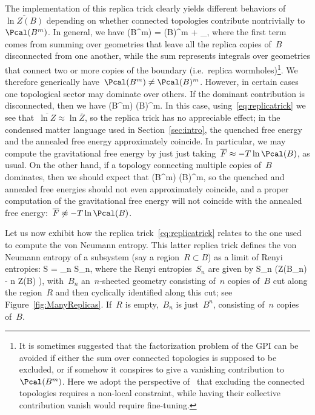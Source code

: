\documentclass[12pt]{article}
\begin{document}
The implementation of this replica trick clearly yields different behaviors of~$\overline{\ln Z(B)}$ depending on whether connected topologies contribute nontrivially to~$\Pcal(B^m)$.  In general, we have
\be
\Pcal(B^m) = \Pcal(B)^m + \sum_{},
\ee
where the first term comes from summing over geometries that leave all the replica copies of~$B$ disconnected from one another, while the sum represents integrals over geometries that connect two or more copies of the boundary (i.e.~replica wormholes)\footnote{It is sometimes suggested that the factorization problem of the GPI can be avoided if either the sum over connected topologies is supposed to be excluded, or if somehow it conspires to give a vanishing contribution to~$\Pcal(B^m)$.  Here we adopt the perspective of~\cite{MarMax20} that excluding the connected topologies requires a non-local constraint, while having their collective contribution vanish would require fine-tuning.}.  We therefore generically have~$\Pcal(B^m) \neq \Pcal(B)^m$.  However, in certain cases one topological sector may dominate over others.  If the dominant contribution is disconnected, then 
we have
\be
\Pcal(B^m) \approx \Pcal(B)^m.
\ee
In this case, using~\eqref{eq:replicatrick} we see that~$\overline{\ln Z} \approx \ln \overline{Z}$, so the replica trick has no appreciable effect; in the condensed matter language used in Section~\ref{sec:intro}, the quenched free energy and the annealed free energy approximately coincide.  In particular, we may compute the gravitational free energy by just just taking~$\overline{F} \approx -T \ln \Pcal(B)$, as usual.  On the other hand, if a topology connecting multiple copies of~$B$ dominates, then we should expect that
\be
\Pcal(B^m) \not\approx \Pcal(B)^m,
\ee
so the quenched and annealed free energies should not even approximately coincide, and a proper computation of the gravitational free energy will not coincide with the annealed free energy:~$\overline{F} \not\approx -T \ln \Pcal(B)$.

Let us now exhibit how the replica trick~\eqref{eq:replicatrick} relates to the one used to compute the von Neumann entropy.  This latter replica trick defines the von Neumann entropy of a subsystem (say a region~$R \subset B$) as a limit of Renyi entropies:
\be
S = \lim_{n } S_n,
\ee
where the Renyi entropies~$S_n$ are given by
\be
S_n \equiv {} \left(\ln Z(B_n) - n \ln Z(B) \right),
\ee
with~$B_n$ an~$n$-sheeted geometry consisting of~$n$ copies of~$B$ cut along the region~$R$ and then cyclically identified along this cut; see Figure~\ref{fig:ManyReplicas}.  If~$R$ is empty,~$B_n$ is just~$B^n$, consisting of~$n$ copies of~$B$.
\end{document}
